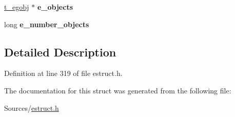 \begin{DoxyCompactItemize}
\item 
\hypertarget{struct__elayer_a6f0b120b9e9be17af36ba96a368ffccb}{\hyperlink{struct__egobj}{t\-\_\-egobj} $\ast$ {\bfseries e\-\_\-objects}}\label{struct__elayer_a6f0b120b9e9be17af36ba96a368ffccb}

\item 
\hypertarget{struct__elayer_ad5b10c31f81ecf9116b72b70b25f9e79}{long {\bfseries e\-\_\-number\-\_\-objects}}\label{struct__elayer_ad5b10c31f81ecf9116b72b70b25f9e79}

\end{DoxyCompactItemize}


\subsection{Detailed Description}


Definition at line 319 of file estruct.\-h.



The documentation for this struct was generated from the following file\-:\begin{DoxyCompactItemize}
\item 
Sources/\hyperlink{estruct_8h}{estruct.\-h}\end{DoxyCompactItemize}
